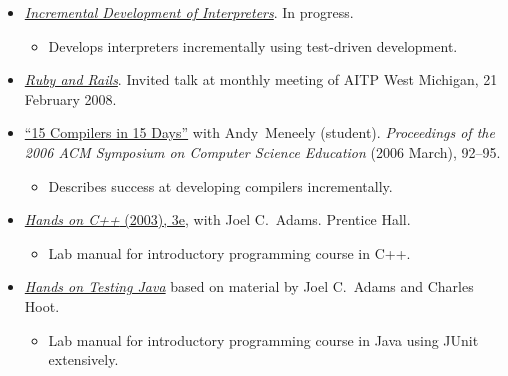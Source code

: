 \documentclass[letterpaper,10pt]{article}
\newcommand{\resitem}[1]{\vspace{-2pt} \item #1}
\begin{document}
\setlength{\parsep}{0mm}
\setlength{\topsep}{0mm}
\setlength{\itemsep}{0mm}
\begin{itemize}
	\item \href{http://cs.calvin.edu/curriculum/cs/214/jdfrens/Labs/}{\textit{Incremental Development of Interpreters}}.  In progress.
  \vspace{-1mm}
	\begin{itemize}
		\resitem{Develops interpreters incrementally using test-driven development.}
	\end{itemize}

	\item \href{http://norecess.org/frens-aitp-ruby-and-rails.pdf}{\textit{Ruby and Rails}}.  Invited talk at monthly meeting of AITP West Michigan, 21 February 2008.
	
	\item \href{http://doi.acm.org/10.1145/1121341.1121372}{``15 Compilers in 15 Days''} with Andy~Meneely (student).  \textit{Proceedings of the 2006 ACM Symposium on Computer Science Education} (2006 March), 92--95.
  \vspace{-1mm}
	  \begin{itemize}
		\resitem{Describes success at developing compilers incrementally.}
  	\end{itemize}
	
	\item \href{http://cs.calvin.edu/books/c++/intro/3e/HandsOnC++/}{\textit{Hands on C++} (2003), 3e}, with Joel C.\ Adams.  Prentice Hall.
  \vspace{-1mm}
	  \begin{itemize}
	    \resitem{Lab manual for introductory programming course in C++.}
	  \end{itemize}
	  
	\item \href{http://cs.calvin.edu/curriculum/cs/108/HoTJ/}{\textit{Hands on Testing Java}} based on material by Joel C.\ Adams and Charles Hoot.
  \vspace{-1mm}
	  \begin{itemize}
	    \resitem{Lab manual for introductory programming course in Java using JUnit extensively.}
	  \end{itemize}
  
\end{itemize}
\end{document}
